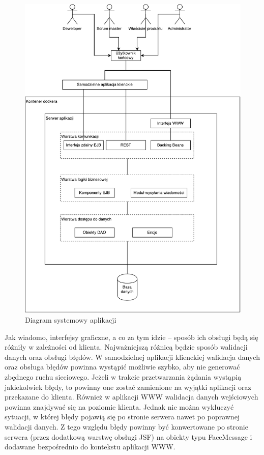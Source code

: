 \begin{figure}[h!]
	\centering
	\includegraphics[width=13.5cm]{rysunki/diagsys.pdf}	
	\caption{Diagram systemowy aplikacji}
	\label{fig:diagsys}
\end{figure}

Jak wiadomo, interfejsy graficzne, a co za tym idzie – sposób ich obsługi będą się różniły w zależności od klienta. Najważniejszą różnicą będzie sposób walidacji danych oraz obsługi błędów. W samodzielnej aplikacji klienckiej walidacja danych oraz obsługa błędów powinna wystąpić możliwie szybko, aby nie generować zbędnego ruchu sieciowego. Jeżeli w trakcie przetwarzania żądania wystąpią jakiekolwiek błędy, to powinny one zostać zamienione na wyjątki aplikacji oraz przekazane do klienta. Również w aplikacji WWW walidacja danych wejściowych powinna znajdywać się na poziomie klienta. Jednak nie można wykluczyć sytuacji, w której błędy pojawią się po stronie serwera nawet po poprawnej walidacji danych. Z tego względu błędy powinny być konwertowane po stronie serwera (przez dodatkową warstwę obsługi JSF) na obiekty typu FaceMessage i dodawane bezpośrednio do kontekstu aplikacji WWW. 

